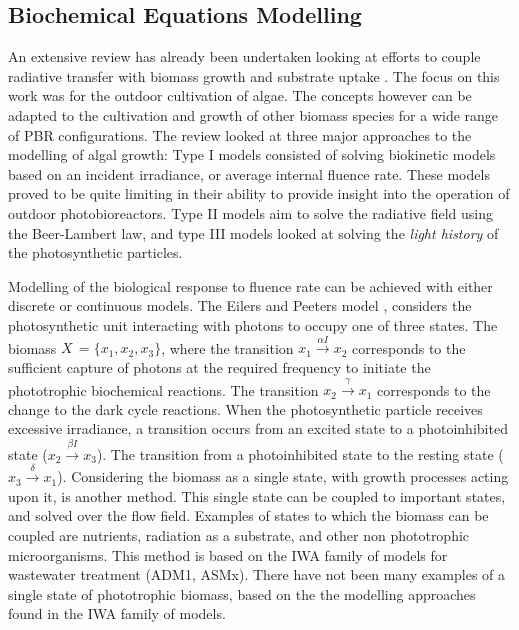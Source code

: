 \subsection{Biochemical Equations Modelling}
\label{S:3.3}
An extensive review has already been undertaken looking at efforts to couple radiative transfer with biomass growth and substrate uptake \cite{bechet2013}. The focus on this work was for the outdoor cultivation of algae. The concepts however can be adapted to the cultivation and growth of other biomass species for a wide range of PBR configurations. The review looked at three major approaches to the modelling of algal growth: Type I models consisted of solving biokinetic models based on an incident irradiance, or average internal fluence rate. These models proved to be quite limiting in their ability to provide insight into the operation of outdoor photobioreactors. Type II models aim to solve the radiative field using the Beer-Lambert law, and type III models looked at solving the \textit{light history} of the photosynthetic particles.

\skippingparagraph
Modelling of the biological response to fluence rate can be achieved with either discrete or continuous models. The Eilers and Peeters model \cite{eilers1988}, considers the photosynthetic unit interacting with photons to occupy one of three states. The biomass $X \,= \{x_1, x_2, x_3\}$, where the transition $x_1 \xrightarrow{\alpha I} x_2$ corresponds to the sufficient capture of photons at the required frequency to initiate the phototrophic biochemical reactions. The transition $x_2 \xrightarrow{\gamma} x_1$ corresponds to the change to the dark cycle reactions. When the photosynthetic particle receives excessive irradiance, a transition occurs from an excited state to a photoinhibited state ($x_2 \xrightarrow{\beta I} x_3$). The transition from a photoinhibited state to the resting state ($x_3 \xrightarrow{\delta} x_1$). 
\skippingparagraph
Considering the biomass as a single state, with growth processes acting upon it, is another method. This single state can be coupled to important states, and solved over the flow field. Examples of states to which the biomass can be coupled are nutrients, radiation as a substrate, and other non phototrophic microorganisms. This method is based on the IWA family of models for wastewater treatment (ADM1, ASMx). There have not been many examples of a single state of phototrophic biomass, based on the the modelling approaches found in the IWA family of models. %

